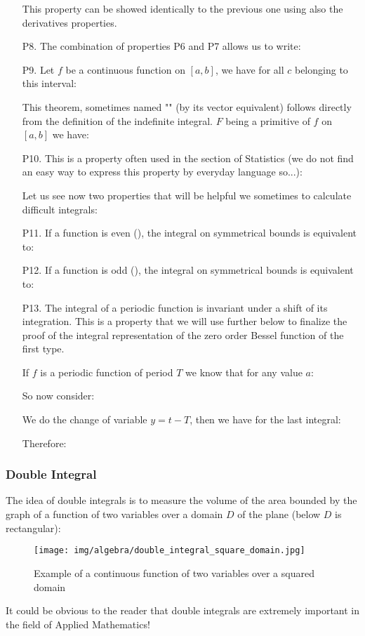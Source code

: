 \begin{enumerate}
		This property can be showed identically to the previous one using also the derivatives properties.
		\item[P8.] The combination of properties P6 and P7 allows us to write:
		
		\item[P9.] Let $f$ be a continuous function on $[a, b]$, we have for all $c$ belonging to this interval:
		
		This theorem, sometimes named "" (by its vector equivalent) follows directly from the definition of the indefinite integral. $F$ being a primitive of $f$ on $[a, b]$ we have:
		
		\item[P10.] This is a property often used in the section of Statistics (we do not find an easy way to express this property by everyday language so...):
		
		 Let us see now two properties that will be helpful we sometimes to calculate difficult integrals:
		\item[P11.] If a function is even (), the integral on symmetrical bounds is equivalent to:
		
		\item[P12.] If a function is odd (), the integral on symmetrical bounds is equivalent to:
		
		
		\item[P13.] The integral of a periodic function is invariant under a shift of its integration. This is a property that we will use further below to finalize the proof of the integral representation of the zero order Bessel function of the first type.
	
		If $f$ is a periodic function of period $T$ we know that for any value $a$:
		
		So now consider:
		
		We do the change of variable $y=t-T$, then we have for the last integral:
		
		Therefore:
		
	\end{enumerate}
	
	\pagebreak
	\subsubsection{Double Integral}\label{double integral}
	The idea of double integrals is to measure the volume of the area bounded by the graph of a function of two variables over a domain $D$ of the plane (below $D$ is rectangular):
	\begin{figure}[H]
		\centering
		\texttt{[image: img/algebra/double\_integral\_square\_domain.jpg]}
		\caption{Example of a continuous function of two variables over a squared domain}
	\end{figure}
	It could be obvious to the reader that double integrals are extremely important in the field of Applied Mathematics!
	
